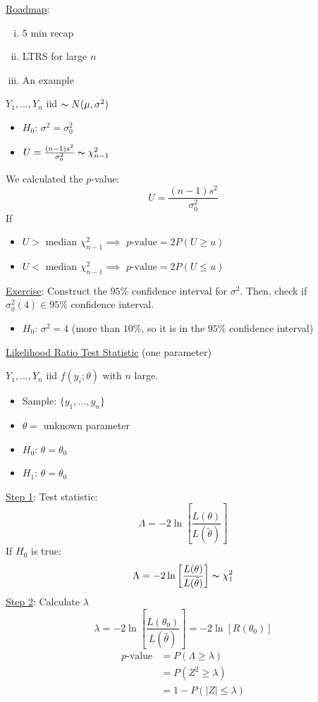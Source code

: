\underline{Roadmap}:
\begin{enumerate}[(i)]
    \item 5 min recap
    \item LTRS for large $ n $
    \item An example
\end{enumerate}

$ Y_1,\ldots ,Y_n $ iid $ \thicksim N(\mu,\sigma^2) $
\begin{itemize}
    \item $ H_0 $: $ \sigma^2=\sigma_0^2 $
    \item $ U=\frac{(n-1)s^2}{\sigma_0^2} \thicksim \chi^2_{n-1} $
\end{itemize}
We calculated the $ p $-value:
\[ U=\frac{(n-1)s^2}{\sigma_0^2}  \]
If
\begin{itemize}
    \item $ U > $ median $ \chi^2_{n-1} \implies $ $ p\text{-value}=2P(U\geqslant u) $
    \item $ U < $ median $ \chi^2_{n-1} \implies $ $ p\text{-value}=2P(U\leqslant u) $
\end{itemize}
\underline{Exercise}: Construct the $ 95\% $ confidence interval for $ \sigma^2 $.
Then, check if $ \sigma_0^2(4)\in 95\% $ confidence interval.
\begin{itemize}
    \item $ H_0 $: $ \sigma^2=4 $ (more than $ 10\% $, so it is in the $ 95\% $
          confidence interval)
\end{itemize}

\underline{Likelihood Ratio Test Statistic} (one parameter)

$ Y_1,\ldots ,Y_n $ iid $ f(y_i;\theta) $ with $ n $ large.
\begin{itemize}
    \item Sample: $ \{y_1,\ldots ,y_n\} $
    \item $ \theta= $ unknown parameter
    \item $ H_0 $: $ \theta=\theta_0 $
    \item $ H_1 $: $ \theta=\theta_0 $
\end{itemize}
\underline{Step 1}: Test statistic:
\[ \Lambda=-2\ln\left[ \frac{L(\theta)}{L(\tilde{\theta})}  \right] \]
If $ H_0 $ is true:
\[ \Lambda=-2\ln\left[ \frac{L(\theta)}{L(\tilde{\theta})}  \right]
    \thicksim \chi^2_{1} \]
\underline{Step 2}: Calculate $ \lambda $
\[ \lambda=-2\ln\left[ \frac{L(\theta_0)}{L(\hat{\theta})}  \right]=-2\ln
    \left[ R(\theta_0) \right] \]
\begin{align*}
    p\text{-value}
     & =P(\Lambda\geqslant \lambda) \\
     & =P(Z^2\geqslant \lambda)     \\
     & =1-P(|Z|\leqslant \lambda)
\end{align*}

